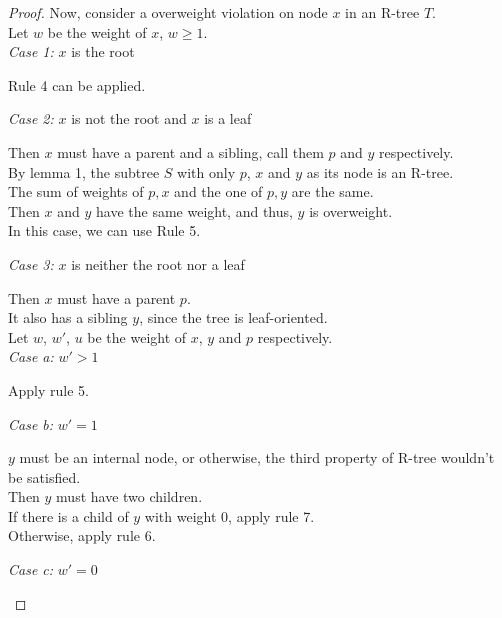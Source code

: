 \documentclass[10pt]{article}
\begin{document}
\begin{enumerate}
\begin{proof}

	Now, consider a overweight violation on node $x$ in an R-tree $T$. \\
	Let $w$ be the weight of $x$, $w \geq 1$. \\
	\textit{Case 1:} $x$ is the root
	\begin{addmargin}[1em]{0em}
		Rule 4 can be applied.
	\end{addmargin}
	\textit{Case 2:} $x$ is not the root and $x$ is a leaf
	\begin{addmargin}[1em]{0em}
		Then $x$ must have a parent and a sibling, call them $p$ and $y$
		respectively. \\
		By lemma 1, the subtree $S$ with only $p$, $x$ and $y$ as its node is
		an R-tree. \\
		The sum of weights of $p,x$ and the one of $p,y$ are the same. \\
		Then $x$ and $y$ have the same weight, and thus, $y$ is overweight. \\
		In this case, we can use Rule 5.
	\end{addmargin}
	\textit{Case 3:} $x$ is neither the root nor a leaf
	\begin{addmargin}[1em]{0em}
		Then $x$ must have a parent $p$. \\
		It also has a sibling $y$, since the tree is leaf-oriented. \\
		Let $w$, $w'$, $u$ be the weight of $x$, $y$ and $p$ respectively. \\
		\textit{Case a:} $w' > 1$
		\begin{addmargin}[1em]{0em}
			Apply rule 5.
		\end{addmargin}
		\textit{Case b:} $w' = 1$
		\begin{addmargin}[1em]{0em}
			$y$ must be an internal node, or otherwise, the third property of
			R-tree wouldn't be satisfied. \\
			Then $y$ must have two children. \\
			If there is a child of $y$ with weight 0, apply rule 7. \\
			Otherwise, apply rule 6.
		\end{addmargin}
		\textit{Case c:} $w' = 0$
		\begin{addmargin}[1em]{0em}
		\end{addmargin}
	\end{addmargin}
	\end{proof}


\end{enumerate}
\end{document}

